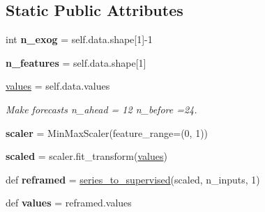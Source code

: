 \subsection*{Static Public Attributes}
\begin{DoxyCompactItemize}
\item 
\mbox{\label{classsimulator_1_1Simulator_afc4d47a8dfe8b49a22c3038b0698dc1e}} 
int {\bfseries n\+\_\+exog} = self.\+data.\+shape\mbox{[}1\mbox{]}-\/1
\item 
\mbox{\label{classsimulator_1_1Simulator_aec5cb73317d556418a5c9de5ecc8882a}} 
{\bfseries n\+\_\+features} = self.\+data.\+shape\mbox{[}1\mbox{]}
\item 
\mbox{\label{classsimulator_1_1Simulator_afd708a73cba150a90c4120bb9b10323d}} 
\hyperlink{classsimulator_1_1Simulator_afd708a73cba150a90c4120bb9b10323d}{values} = self.\+data.\+values
\begin{DoxyCompactList}\small\item\em Make forecasts n\+\_\+ahead = 12 n\+\_\+before =24. \end{DoxyCompactList}\item 
\mbox{\label{classsimulator_1_1Simulator_a74056619ad959c47ceee446c6d1606de}} 
{\bfseries scaler} = Min\+Max\+Scaler(feature\+\_\+range=(0, 1))
\item 
\mbox{\label{classsimulator_1_1Simulator_ad8639127fd1595a5a9e32890896244e7}} 
{\bfseries scaled} = scaler.\+fit\+\_\+transform(\hyperlink{classsimulator_1_1Simulator_afd708a73cba150a90c4120bb9b10323d}{values})
\item 
\mbox{\label{classsimulator_1_1Simulator_a07b3e2267211311d7367accc5a046fb3}} 
def {\bfseries reframed} = \hyperlink{classsimulator_1_1Simulator_aac4274501be3a4b0f9f2102704d9e866}{series\+\_\+to\+\_\+supervised}(scaled, n\+\_\+inputs, 1)
\item 
\mbox{\label{classsimulator_1_1Simulator_a4acb717a15851ed0dd73c4cc4bdfddf2}} 
def {\bfseries values} = reframed.\+values
\item 
\mbox{\label{classsimulator_1_1Simulator_a312de68516dfbab5df1c728547be8eb0}} 

\end{DoxyCompactItemize}
